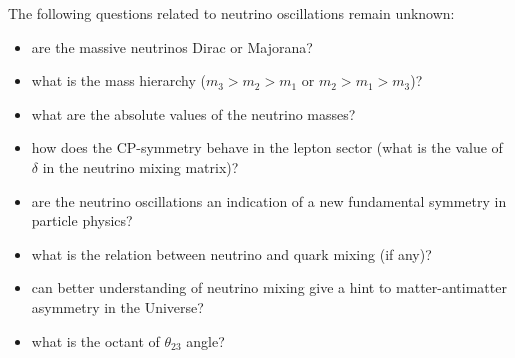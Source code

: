 The following questions related to neutrino oscillations remain unknown: 
\begin{itemize}
  \item are the massive neutrinos Dirac or Majorana?
  \item what is the mass hierarchy ($m_3>m_2>m_1$ or $m_2>m_1>m_3$)?
  \item what are the absolute values of the neutrino masses?
  \item how does the CP-symmetry behave in the lepton sector (what is the value of $\delta$ in the neutrino mixing matrix)?
  \item are the neutrino oscillations an indication of a new fundamental symmetry in particle physics?
  \item what is the relation between neutrino and quark mixing (if any)?
  \item can better understanding of neutrino mixing give a hint to matter-antimatter asymmetry in the Universe?
  \item what is the octant of $\theta_{23}$ angle?
\end{itemize} 
